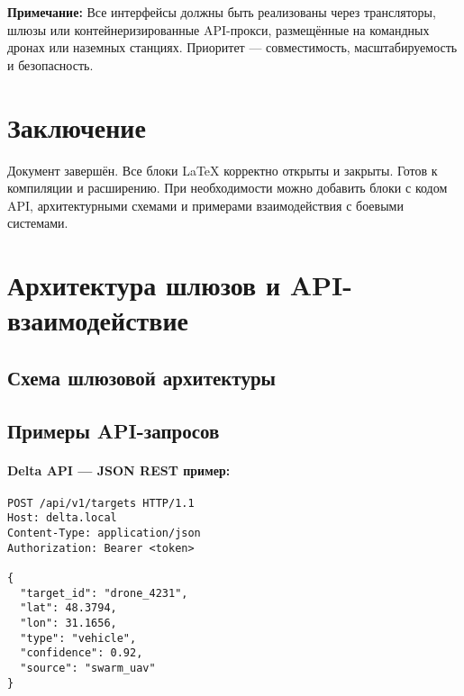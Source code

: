 \documentclass{article}
\begin{document}
\textbf{Примечание:} Все интерфейсы должны быть реализованы через трансляторы, шлюзы или контейнеризированные API-прокси, размещённые на командных дронах или наземных станциях. Приоритет — совместимость, масштабируемость и безопасность.

\section*{Заключение}

Документ завершён. Все блоки LaTeX корректно открыты и закрыты. Готов к компиляции и расширению. При необходимости можно добавить блоки с кодом API, архитектурными схемами и примерами взаимодействия с боевыми системами.


\section*{Архитектура шлюзов и API-взаимодействие}
\subsection*{Схема шлюзовой архитектуры}
\begin{center}
\end{center}

\subsection*{Примеры API-запросов}

\paragraph{Delta API — JSON REST пример:}
\begin{verbatim}
POST /api/v1/targets HTTP/1.1
Host: delta.local
Content-Type: application/json
Authorization: Bearer <token>

{
  "target_id": "drone_4231",
  "lat": 48.3794,
  "lon": 31.1656,
  "type": "vehicle",
  "confidence": 0.92,
  "source": "swarm_uav"
}
\end{verbatim}
\end{document}
